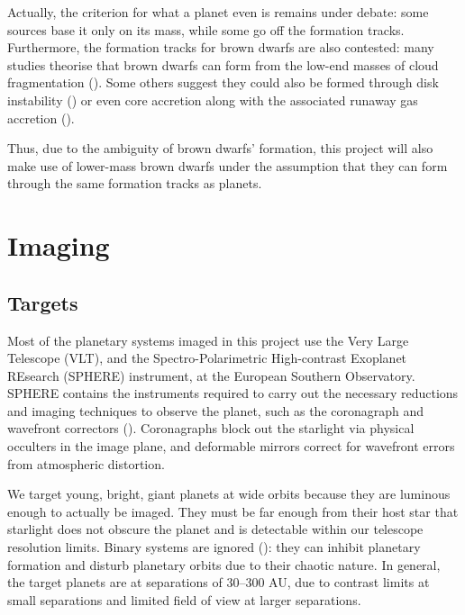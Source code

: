 \documentclass[11pt]{report}
\begin{document}
\begin{mainf}
\begin{sloppypar}
Actually, the criterion for what a planet even is remains under debate: some sources base it only on its mass, while some go off the formation tracks. Furthermore, the formation tracks for brown dwarfs are also contested:
many studies theorise that brown dwarfs can form from the low-end masses of cloud fragmentation (\citealp{Chabrier2003,Balmer2024}). Some others suggest they could also be formed through
disk instability (\citealp{Boss1997,Stamatellos2007,Stamatellos2009}) or even core accretion along with the associated runaway gas accretion (\citealp{DAngelo2010,Molliere2012,Balmer2024}).
\end{sloppypar}

Thus, due to the ambiguity of brown dwarfs' formation, this project will also make use of lower-mass brown dwarfs under the assumption that they can form through the same formation tracks as planets.


\section{Imaging}\label{sec:imaging}
\subsection{Targets}
Most of the planetary systems imaged in this project use the Very Large Telescope (VLT), and the Spectro-Polarimetric High-contrast Exoplanet REsearch (SPHERE) instrument, at the European Southern Observatory.
SPHERE contains the instruments required to carry out the necessary reductions and imaging techniques to observe the planet, such as the coronagraph and wavefront correctors (\citealp{Currie2023}). 
Coronagraphs block out the starlight via physical occulters in the image plane, and deformable mirrors correct for wavefront errors from atmospheric distortion. 

We target young, bright, giant planets at wide orbits because they are luminous enough to actually be imaged. They must be far enough from their host star that
starlight does not obscure the planet and is detectable within our telescope resolution limits. Binary systems are ignored (\citealp{Currie2023}): they can inhibit planetary formation and disturb planetary orbits due to their chaotic nature. 
In general, the target planets are at separations of 30--300 AU, due to contrast limits at small separations and limited field of view at larger separations.


\end{mainf}
\end{document}
